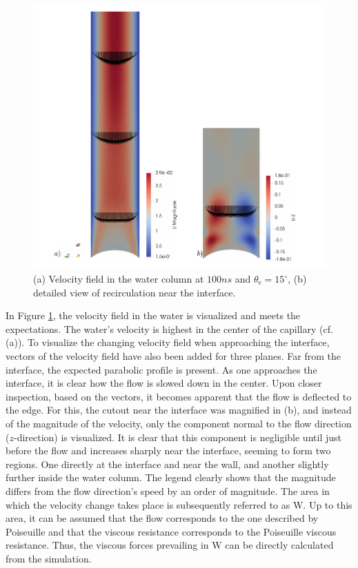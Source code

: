 \begin{figure}[h] 
    \centering
    \includegraphics[width=.95\textwidth]{Pictures/Velo_Wedge.pdf}
    \caption{(a) Velocity field in the water column at $100ns$ and $\theta_{\mathrm{e}}=15^{\circ}$, (b) detailed view of recirculation near the interface.}
    \label{fig: Velofield_Wedge}
\end{figure}

In Figure \ref{fig: Velofield_Wedge}, the velocity field in the water is visualized and meets the expectations. The water's velocity is highest in the center of the capillary (cf. (a)). To visualize the changing velocity field when approaching the interface, vectors of the velocity field have also been added for three planes. Far from the interface, the expected parabolic profile is present. As one approaches the interface, it is clear how the flow is slowed down in the center. Upon closer inspection, based on the vectors, it becomes apparent that the flow is deflected to the edge. For this, the cutout near the interface was magnified in (b), and instead of the magnitude of the velocity, only the component normal to the flow direction ($z$-direction) is visualized. It is clear that this component is negligible until just before the flow and increases sharply near the interface, seeming to form two regions. One directly at the interface and near the wall, and another slightly further inside the water column. The legend clearly shows that the magnitude differs from the flow direction's speed by an order of magnitude. The area in which the velocity change takes place is subsequently referred to as $\mathrm{W}$. Up to this area, it can be assumed that the flow corresponds to the one described by Poiseuille and that the viscous resistance corresponds to the Poiseuille viscous resistance. Thus, the viscous forces prevailing in $\mathrm{W}$ can be directly calculated from the simulation.


